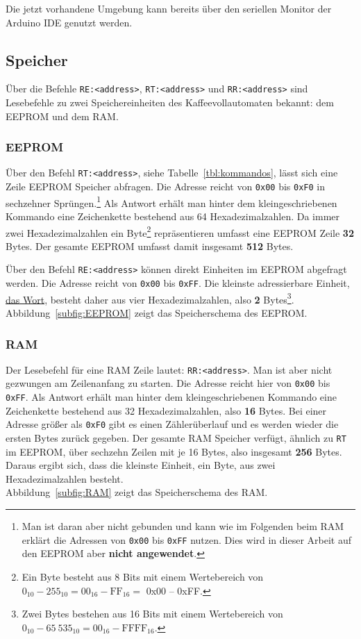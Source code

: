 Die jetzt vorhandene Umgebung kann bereits über den seriellen Monitor der Arduino \ac{IDE} genutzt werden.

\subsection{Speicher}
Über die Befehle \texttt{RE:<address>}, \texttt{RT:<address>} und \texttt{RR:<address>} sind Lesebefehle zu zwei Speichereinheiten des Kaffeevollautomaten bekannt: dem \acf{EEPROM} und dem \acf{RAM}.

\subsubsection{EEPROM}\label{subsubsec:SpeicherDesKaffeevollautomatenEEPROM}
Über den Befehl \texttt{RT:<address>}, siehe Tabelle~\ref{tbl:kommandos}, lässt sich eine Zeile \ac{EEPROM} Speicher abfragen.
Die Adresse reicht von \texttt{0x00} bis \texttt{0xF0} in sechzehner Sprüngen.\footnote{Man ist daran aber nicht gebunden und kann wie im Folgenden beim \ac{RAM} erklärt die Adressen von \texttt{0x00} bis \texttt{0xFF} nutzen. Dies wird in dieser Arbeit auf den \ac{EEPROM} aber \textbf{nicht angewendet}.}
Als Antwort erhält man hinter dem kleingeschriebenen Kommando eine Zeichenkette bestehend aus 64 Hexadezimalzahlen.
Da immer zwei Hexadezimalzahlen ein Byte\footnote{Ein Byte besteht aus 8 Bits mit einem Wertebereich von $0_{10}-255_{10} = 00_{16}-\text{FF}_{16} = $ 0x00 -- 0xFF.} repräsentieren umfasst eine \ac{EEPROM} Zeile \textbf{32} Bytes.
Der gesamte \ac{EEPROM} umfasst damit insgesamt \textbf{512} Bytes.

Über den Befehl \texttt{RE:<address>} können direkt Einheiten im \ac{EEPROM} abgefragt werden. Die Adresse reicht von \texttt{0x00} bis \texttt{0xFF}.
Die kleinste adressierbare Einheit, \underline{das Wort}, besteht daher aus vier Hexadezimalzahlen, also \textbf{2} Bytes\footnote{Zwei Bytes bestehen aus 16 Bits mit einem Wertebereich von $0_{10}-65\:535_{10} = 00_{16}-\text{FFFF}_{16}$.}.\\
Abbildung~\ref{subfig:EEPROM} zeigt das Speicherschema des \ac{EEPROM}.

\subsubsection{RAM}\label{subsubsec:SpeicherDesKaffeevollautomatenRAM}
Der Lesebefehl für eine \ac{RAM} Zeile lautet: \texttt{RR:<address>}.
Man ist aber nicht gezwungen am Zeilenanfang zu starten.
Die Adresse reicht hier von \texttt{0x00} bis \texttt{0xFF}.
Als Antwort erhält man hinter dem kleingeschriebenen Kommando eine Zeichenkette bestehend aus 32 Hexadezimalzahlen, also \textbf{16} Bytes.
Bei einer Adresse größer als \texttt{0xF0} gibt es einen Zählerüberlauf und es werden wieder die ersten Bytes zurück gegeben.
Der gesamte \ac{RAM} Speicher verfügt, ähnlich zu \texttt{RT} im \ac{EEPROM}, über sechzehn Zeilen mit je 16 Bytes, also insgesamt \textbf{256} Bytes.
Daraus ergibt sich, dass die kleinste Einheit, ein Byte, aus zwei Hexadezimalzahlen besteht.\\
Abbildung~\ref{subfig:RAM} zeigt das Speicherschema des \ac{RAM}.



